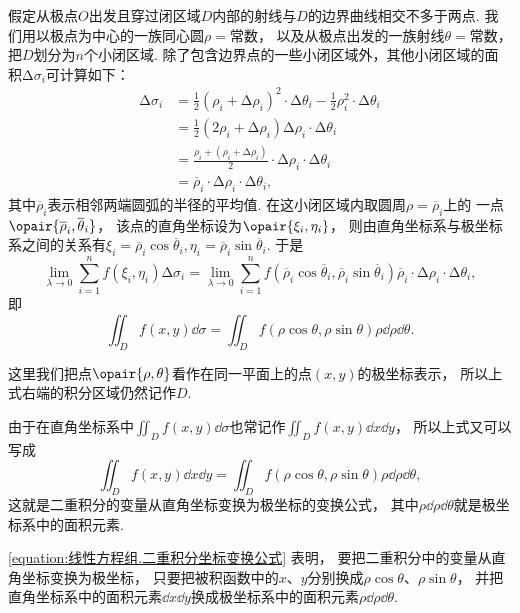 假定从极点\(O\)出发且穿过闭区域\(D\)内部的射线与\(D\)的边界曲线相交不多于两点.
我们用以极点为中心的一族同心圆\(\rho = \text{常数}\)，
以及从极点出发的一族射线\(\theta = \text{常数}\)，
把\(D\)划分为\(n\)个小闭区域.
除了包含边界点的一些小闭区域外，其他小闭区域的面积\(\increment\sigma_i\)可计算如下：
\begin{align*}
	\increment\sigma_i
	&= \frac{1}{2} (\rho_i+\increment\rho_i)^2 \cdot \increment\theta_i
	- \frac{1}{2} \rho_i^2 \cdot \increment\theta_i \\
	&= \frac{1}{2} (2\rho_i + \increment\rho_i) \increment\rho_i \cdot \increment\theta_i \\
	&= \frac{\rho_i + (\rho_i+\increment\rho_i)}{2}
		\cdot \increment\rho_i \cdot \increment\theta_i \\
	&= \overline{\rho}_i \cdot \increment\rho_i \cdot \increment\theta_i,
\end{align*}
其中\(\overline{\rho}_i\)表示相邻两端圆弧的半径的平均值.
在这小闭区域内取圆周\(\rho = \overline{\rho}_i\)上的
一点\(\opair{\overline{\rho}_i,\overline{\theta}_i}\)，
该点的直角坐标设为\(\opair{\xi_i,\eta_i}\)，
则由直角坐标系与极坐标系之间的关系有\(\xi_i = \overline{\rho}_i \cos\overline{\theta}_i,
\eta_i = \overline{\rho}_i \sin\overline{\theta}_i\).
于是\[
	\lim\limits_{\lambda\to0} \sum\limits_{i=1}^n f(\xi_i,\eta_i) \increment\sigma_i
	= \lim\limits_{\lambda\to0} \sum\limits_{i=1}^n
	f(\overline{\rho}_i \cos\overline{\theta}_i,\overline{\rho}_i \sin\overline{\theta}_i)
	\overline{\rho}_i \cdot \increment\rho_i \cdot \increment\theta_i,
\]
即\[
	\iint_D f(x,y) \dd{\sigma}
	= \iint_D f(\rho\cos\theta,\rho\sin\theta) \rho \dd{\rho} \dd{\theta}.
\]

这里我们把点\(\opair{\rho,\theta}\)看作在同一平面上的点\((x,y)\)的极坐标表示，
所以上式右端的积分区域仍然记作\(D\).

由于在直角坐标系中\(\iint_D f(x,y) \dd{\sigma}\)也常记作\(\iint_D f(x,y) \dd{x} \dd{y}\)，
所以上式又可以写成
\begin{equation}\label{equation:线性方程组.二重积分坐标变换公式}
\iint_D f(x,y) \dd{x} \dd{y}
= \iint_D f(\rho\cos\theta,\rho\sin\theta) \rho \dd{\rho} \dd{\theta},
\end{equation}
这就是二重积分的变量从直角坐标变换为极坐标的变换公式，
其中\(\rho \dd{\rho} \dd{\theta}\)就是极坐标系中的面积元素.

\cref{equation:线性方程组.二重积分坐标变换公式} 表明，
要把二重积分中的变量从直角坐标变换为极坐标，
只要把被积函数中的\(x\)、\(y\)分别换成\(\rho \cos\theta\)、\(\rho \sin\theta\)，
并把直角坐标系中的面积元素\(\dd{x} \dd{y}\)换成极坐标系中的面积元素\(\rho \dd{\rho} \dd{\theta}\).


